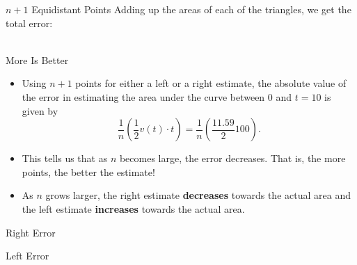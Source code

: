 \documentclass[Lecture.tex]{subfiles}
\begin{document}
\begin{frame}{$n+1$ Equidistant Points}
  Adding up the areas of each of the triangles, we get the total error:\\
  \\
\end{frame}

\begin{frame}{More Is Better}
  \begin{itemize}
  \item<1->
    Using $n+1$ points for either a left or a right estimate, the absolute value of the error in estimating the area under the curve between $0$ and $t = 10$ is given by 
    $$\frac{1}{n}\left(\frac{1}{2}v(t) \cdot t \right) = \frac{1}{n}\left(\frac{11.59}{2}100\right).$$
  \item<2->
    This tells us that as $n$ becomes large, the error decreases.
    That is, the more points, the better the estimate!
  \item<3->
    As $n$ grows larger, the right estimate {\bf decreases} towards the actual area and the left estimate {\bf increases} towards the actual area.
  \end{itemize}
\end{frame}

\begin{frame}{Right Error}
\end{frame}

\begin{frame}{Left Error}
\end{frame}
\end{document}
